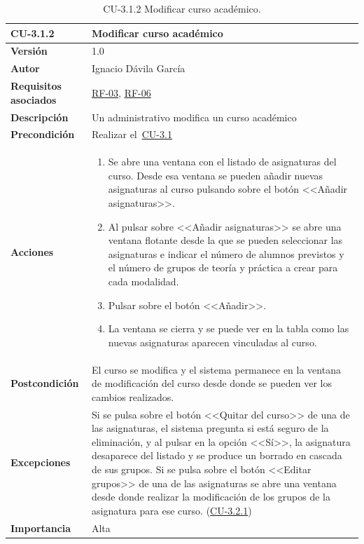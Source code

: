 \begin{table}[p]
\label{table:CU-3.1.2}
	\centering
	\begin{tabularx}{\linewidth}{ p{} p{} }
		\toprule
		\textbf{CU-3.1.2}    & \textbf{Modificar curso académico}\\
		\toprule
		\textbf{Versión}              & 1.0    \\
		\textbf{Autor}                & Ignacio Dávila García \\
		\textbf{Requisitos asociados} & \hyperref[itm:RF3]{RF-03}, \hyperref[itm:RF6]{RF-06} \\
		\textbf{Descripción}          & Un administrativo modifica un curso académico \\
		\textbf{Precondición}         & Realizar el~\hyperref[table:CU-3.1]{CU-3.1} \\
		\textbf{Acciones}             &
		\begin{enumerate}
			\def\labelenumi{\arabic{enumi}.}
			\tightlist
			\item Se abre una ventana con el listado de asignaturas del curso. Desde esa ventana se pueden añadir nuevas asignaturas al curso pulsando sobre el botón <<Añadir asignaturas>>.
			\item Al pulsar sobre <<Añadir asignaturas>> se abre una ventana flotante desde la que se pueden seleccionar las asignaturas e indicar el número de alumnos previstos y el número de grupos de teoría y práctica a crear para cada modalidad. 
			\item Pulsar sobre el botón <<Añadir>>.
			\item La ventana se cierra y se puede ver en la tabla como las nuevas asignaturas aparecen vinculadas al curso.
		\end{enumerate}\\
		\textbf{Postcondición}        & El curso se modifica y el sistema permanece en la ventana de modificación del curso desde donde se pueden ver los cambios realizados. \\
		\textbf{Excepciones}          & Si se pulsa sobre el botón <<Quitar del curso>> de una de las asignaturas, el sistema pregunta si está seguro de la eliminación, y al pulsar en la opción <<Sí>>, la asignatura desaparece del listado y se produce un borrado en cascada de sus grupos. Si se pulsa sobre el botón <<Editar grupos>> de una de las asignaturas se abre una ventana desde donde realizar la modificación de los grupos de la asignatura para ese curso. (\hyperref[table:CU-3.2.1]{CU-3.2.1}) \\
		\textbf{Importancia}          & Alta \\
		\bottomrule
	\end{tabularx}
	\caption{CU-3.1.2 Modificar curso académico.}
\end{table}
\FloatBarrier

